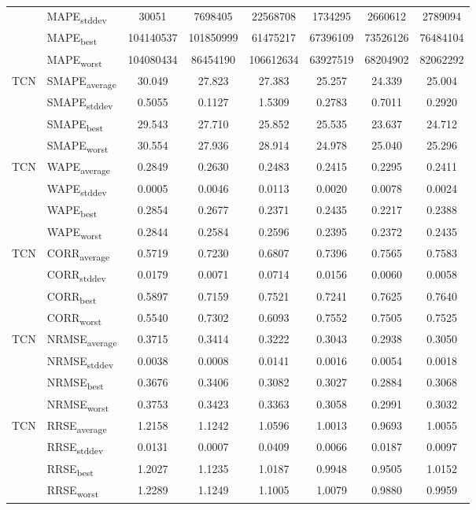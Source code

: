{\begin{longtable}{l l c c c c c c}
 & MAPE\textsubscript{stddev} & 30051 & 7698405 & 22568708 & 1734295 & 2660612 & 2789094 \\
 & MAPE\textsubscript{best} & 104140537 & 101850999 & 61475217 & 67396109 & 73526126 & 76484104 \\
 & MAPE\textsubscript{worst} & 104080434 & 86454190 & 106612634 & 63927519 & 68204902 & 82062292 \\
\cmidrule(lr){2-8}
\multirow{4}{*}{TCN} & SMAPE\textsubscript{average} & 30.049 & 27.823 & 27.383 & 25.257 & 24.339 & 25.004 \\
 & SMAPE\textsubscript{stddev} & 0.5055 & 0.1127 & 1.5309 & 0.2783 & 0.7011 & 0.2920 \\
 & SMAPE\textsubscript{best} & 29.543 & 27.710 & 25.852 & 25.535 & 23.637 & 24.712 \\
 & SMAPE\textsubscript{worst} & 30.554 & 27.936 & 28.914 & 24.978 & 25.040 & 25.296 \\
\cmidrule(lr){2-8}
\multirow{4}{*}{TCN} & WAPE\textsubscript{average} & 0.2849 & 0.2630 & 0.2483 & 0.2415 & 0.2295 & 0.2411 \\
 & WAPE\textsubscript{stddev} & 0.0005 & 0.0046 & 0.0113 & 0.0020 & 0.0078 & 0.0024 \\
 & WAPE\textsubscript{best} & 0.2854 & 0.2677 & 0.2371 & 0.2435 & 0.2217 & 0.2388 \\
 & WAPE\textsubscript{worst} & 0.2844 & 0.2584 & 0.2596 & 0.2395 & 0.2372 & 0.2435 \\
\cmidrule(lr){2-8}
\multirow{4}{*}{TCN} & CORR\textsubscript{average} & 0.5719 & 0.7230 & 0.6807 & 0.7396 & 0.7565 & 0.7583 \\
 & CORR\textsubscript{stddev} & 0.0179 & 0.0071 & 0.0714 & 0.0156 & 0.0060 & 0.0058 \\
 & CORR\textsubscript{best} & 0.5897 & 0.7159 & 0.7521 & 0.7241 & 0.7625 & 0.7640 \\
 & CORR\textsubscript{worst} & 0.5540 & 0.7302 & 0.6093 & 0.7552 & 0.7505 & 0.7525 \\
\cmidrule(lr){2-8}
\multirow{4}{*}{TCN} & NRMSE\textsubscript{average} & 0.3715 & 0.3414 & 0.3222 & 0.3043 & 0.2938 & 0.3050 \\
 & NRMSE\textsubscript{stddev} & 0.0038 & 0.0008 & 0.0141 & 0.0016 & 0.0054 & 0.0018 \\
 & NRMSE\textsubscript{best} & 0.3676 & 0.3406 & 0.3082 & 0.3027 & 0.2884 & 0.3068 \\
 & NRMSE\textsubscript{worst} & 0.3753 & 0.3423 & 0.3363 & 0.3058 & 0.2991 & 0.3032 \\
\cmidrule(lr){2-8}
\multirow{4}{*}{TCN} & RRSE\textsubscript{average} & 1.2158 & 1.1242 & 1.0596 & 1.0013 & 0.9693 & 1.0055 \\
 & RRSE\textsubscript{stddev} & 0.0131 & 0.0007 & 0.0409 & 0.0066 & 0.0187 & 0.0097 \\
 & RRSE\textsubscript{best} & 1.2027 & 1.1235 & 1.0187 & 0.9948 & 0.9505 & 1.0152 \\
 & RRSE\textsubscript{worst} & 1.2289 & 1.1249 & 1.1005 & 1.0079 & 0.9880 & 0.9959 \\
\cmidrule(lr){2-8}
\end{longtable}
}